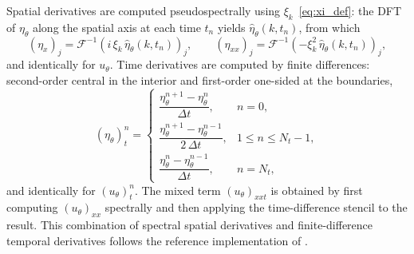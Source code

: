 Spatial derivatives are computed pseudospectrally using $\xi_k$~\eqref{eq:xi_def}: the DFT of $\eta_\theta$ along the spatial axis at each time $t_n$ yields $\hat{\eta}_\theta(k, t_n)$, from which
\begin{equation*}
    (\eta_x)_j = \mathcal{F}^{-1}\!\left(i\,\xi_k\,\hat{\eta}_\theta(k,t_n)\right)_{\!j},
    \qquad
    (\eta_{xx})_j = \mathcal{F}^{-1}\!\left(-\xi_k^2\,\hat{\eta}_\theta(k,t_n)\right)_{\!j},
\end{equation*}
and identically for $u_\theta$. Time derivatives are computed by finite differences: second-order central in the interior and first-order one-sided at the boundaries,
\begin{equation*}
    (\eta_\theta)_t^n =
    \begin{cases}
        \dfrac{\eta_\theta^{n+1} - \eta_\theta^n}{\Delta t}, & n = 0, \\[6pt]
        \dfrac{\eta_\theta^{n+1} - \eta_\theta^{n-1}}{2\,\Delta t}, & 1 \le n \le N_t - 1, \\[6pt]
        \dfrac{\eta_\theta^n - \eta_\theta^{n-1}}{\Delta t}, & n = N_t,
    \end{cases}
\end{equation*}
and identically for $(u_\theta)_t^n$. The mixed term $(u_\theta)_{xxt}$ is obtained by first computing $(u_\theta)_{xx}$ spectrally and then applying the time-difference stencil to the result. This combination of spectral spatial derivatives and finite-difference temporal derivatives follows the reference implementation of \textcite{li2023pino} \parencite{li2023pino_code}.

